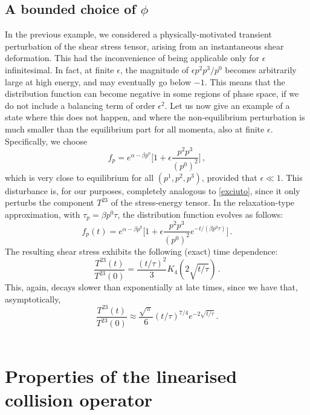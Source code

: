 \documentclass[a4paper, amsfonts, amssymb, amsmath, reprint, showkeys, nofootinbib, twoside, onecolumn,notitlepage,,longbibliography]{revtex4-2}
\theoremstyle{definition}
\theoremstyle{theorem}
\theoremstyle{corollary}
\begin{document}
\subsection{A bounded choice of $\phi$}

In the previous example, we considered a physically-motivated transient perturbation of the shear stress tensor, arising from an instantaneous shear deformation. This had the inconvenience of being applicable only for $\epsilon$ infinitesimal. In fact, at finite $\epsilon$, the magnitude of $\epsilon p^2 p^3/p^0$ becomes arbitrarily large at high energy, and may eventually go below $-1$. This means that the distribution function can become negative in some regions of phase space, if we do not include a balancing term of order $\epsilon^2$. Let us now give an example of a state where this does not happen, and where the non-equilibrium perturbation is much smaller than the equilibrium part for all momenta, also at finite $\epsilon$.
Specifically, we choose
\begin{equation}\label{exciutone}
f_p= e^{\alpha -\beta p^0} \bigg[ 1+\epsilon  \dfrac{p^2 p^3}{(p^0)^2}\bigg] \, ,
\end{equation}
which is very close to equilibrium for all $(p^1,p^2,p^3)$, provided that $\epsilon \ll 1$.
This disturbance is, for our purposes, completely analogous to \eqref{exciuto}, since it only perturbs the component $T^{23}$ of the stress-energy tensor. In the relaxation-type approximation, with $\tau_p=\beta p^0 \tau$, the distribution function evolves as follows:
\begin{equation}\label{exciutot}
f_p(t)= e^{\alpha -\beta p^0} \bigg[ 1+\epsilon  \dfrac{p^2 p^3}{(p^0)^2} e^{-t/(\beta p^0 \tau)}\bigg] \, .
\end{equation}
The resulting shear stress exhibits the following (exact) time dependence:
\begin{equation}
\dfrac{T^{23}(t)}{T^{23}(0)} =\dfrac{(t/\tau)^2}{3} K_4 (2\sqrt{t/\tau}) \, .
\end{equation}
This, again, decays slower than exponentially at late times, since we have that, asymptotically,
\begin{equation}
\dfrac{T^{23}(t)}{T^{23}(0)} \approx \dfrac{\sqrt{\pi}}{6} (t/\tau)^{7/4} e^{-2\sqrt{t/\tau}} \, .
\end{equation}\\



\newpage

\section{Properties of the linearised collision operator}\label{AppHwrm}
\end{document}
